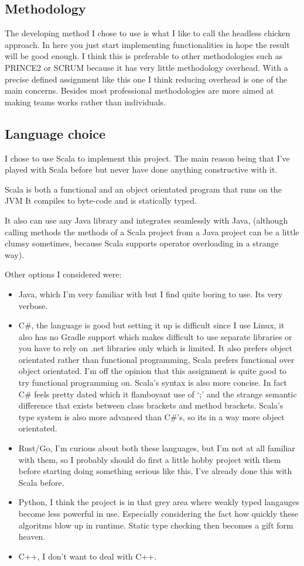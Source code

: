 \documentclass{article}
\begin{document}
\begin{empfile}
\section{Methodology}
The developing method I chose to use is what I like to call the headless
chicken approach. In here you just start implementing functionalities in
hope the result will be good enough. I think this is preferable to other
methodologies such as PRINCE2 or SCRUM because it has very little
methodology overhead.  With a precise defined assignment like this one I
think reducing overhead is one of the main concerns.
Besides most professional methodologies are more
aimed at making teams works rather than individuals.

\subsection{Language choice}
I chose to use Scala to implement this project. The main reason being that I've
played with Scala before but never have done anything constructive with it.

Scala is both a functional and an object orientated program that runs on the JVM
It compiles to byte-code and is statically typed.

It also can use any Java library and integrates seamlessly with Java, (although
calling methods the methods of a Scala project from a Java project can be
a little clumsy sometimes, because Scala supports operator overloading in
a strange way).

Other options I considered were:
\begin{itemize}
	\item Java, which I'm very familiar with but I find quite boring to use.
		Its very verbose.
	\item C\#, the language is good but setting it up is difficult since I
		use Linux, it also has no Gradle support which makes difficult to
		use separate libraries or you have to rely on {.}net libraries only
		which is limited. It also prefers object orientated rather than
		functional programming, Scala prefers functional over object
		orientated. I'm off the opinion that this assignment is quite good
		to try functional programming on. Scala's syntax is also more concise.
		In fact C\# feels pretty dated which it flamboyant use of `;' and the
		strange semantic difference that exists between class brackets and
		method brackets. Scala's type system is also more advanced than
		C#'s, so its in a way more object orientated.
	\item Rust/Go, I'm curious about both these languages, but I'm not at
		all familiar with them, so I probably should do first a little
		hobby project with them before starting doing something serious like
		this, I've already done this with Scala before.
	\item Python, I think the project is in that grey area where weakly
		typed langauges become less powerful in use. Especially considering
		the fact how quickly these algoritms blow up in runtime. Static type
		checking then becomes a gift form heaven.
	\item C++, I don't want to deal with C++.
\end{itemize}


\end{empfile}
\end{document}
